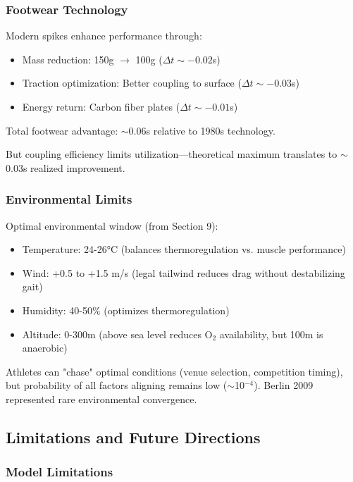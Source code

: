 \documentclass[10pt]{article}
\begin{document}
\subsubsection{Footwear Technology}

Modern spikes enhance performance through:
\begin{itemize}
\item Mass reduction: 150g $\to$ 100g ($\Delta t \sim -0.02$s)
\item Traction optimization: Better coupling to surface ($\Delta t \sim -0.03$s)
\item Energy return: Carbon fiber plates ($\Delta t \sim -0.01$s)
\end{itemize}

Total footwear advantage: $\sim$0.06s relative to 1980s technology.

But coupling efficiency limits utilization—theoretical maximum translates to $\sim$0.03s realized improvement.

\subsubsection{Environmental Limits}

Optimal environmental window (from Section 9):
\begin{itemize}
\item Temperature: 24-26°C (balances thermoregulation vs. muscle performance)
\item Wind: +0.5 to +1.5 m/s (legal tailwind reduces drag without destabilizing gait)
\item Humidity: 40-50\% (optimizes thermoregulation)
\item Altitude: 0-300m (above sea level reduces O$_2$ availability, but 100m is anaerobic)
\end{itemize}

Athletes can "chase" optimal conditions (venue selection, competition timing), but probability of all factors aligning remains low ($\sim$10$^{-4}$). Berlin 2009 represented rare environmental convergence.

\subsection{Limitations and Future Directions}

\subsubsection{Model Limitations}
\end{document}
